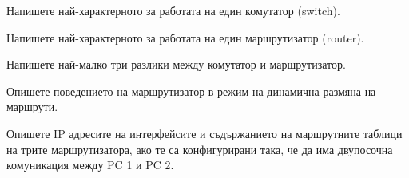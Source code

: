 \begin{questions}
  \question Напишете най-характерното за работата на един комутатор (\foreignlanguage{english}{switch}).


  \question Напишете най-характерното за работата на един маршрутизатор
  (\foreignlanguage{english}{router}).

  \question Напишете най-малко три разлики между комутатор и маршрутизатор.

  \question Опишете поведението на маршрутизатор в режим на динамична размяна на
  маршрути.

  \question Опишете IP адресите на интерфейсите и съдържанието на маршрутните
  таблици на трите маршрутизатора, ако те са конфигурирани така, че да има
  двупосочна комуникация между PC 1 и PC 2.

  \begin{center}
\end{center}
\end{questions}
